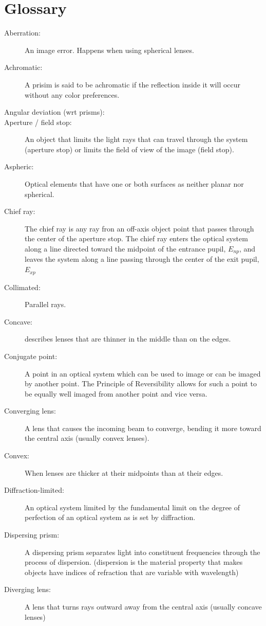 \documentclass[12pt]{report}
\begin{document}
\section{Glossary}
\begin{description}
\item[Aberration: ] An image error. Happens when using spherical lenses.
\item[Achromatic: ] A prisim is said to be achromatic if the reflection inside it will occur without any color preferences. 
\item[Angular deviation (wrt prisms): ]
\item[Aperture / field stop: ] An object that limits the light rays that can travel through the system (aperture stop) or limits the field of view of the image (field stop). 
\item[Aspheric: ] Optical elements that have one or both surfaces as neither planar nor spherical. 
\item[Chief ray: ] The chief ray is any ray fron an off-axis object point that passes through the center of the aperture stop. The chief ray enters the optical system along a line directed toward the midpoint of the entrance pupil, $E_{np}$, and leaves the system along a line passing through the center of the exit pupil, $E_{xp}$
\item[Collimated: ] Parallel rays.
\item[Concave: ] describes lenses that are thinner in the middle than on the edges. 
\item[Conjugate point: ] A point in an optical system which can be used to image or can be imaged by another point. The Principle of Reversibility allows for such a point to be equally well imaged from another point and vice versa. 
\item[Converging lens: ] A lens that causes the incoming beam to converge, bending it more toward the central axis (usually convex lenses).
\item[Convex: ] When lenses are thicker at their midpoints than at their edges. 
\item[Diffraction-limited: ] An optical system limited by the fundamental limit on the degree of perfection of an optical system as is set by diffraction. 
\item[Dispersing prism: ] A dispersing prism separates light into constituent frequencies through the process of dispersion. (dispersion is the material property that makes objects have indices of refraction that are variable with wavelength)
\item[Diverging lens: ] A lens that turns rays outward away from the central axis (usually concave lenses)

\end{description}
\end{document}
